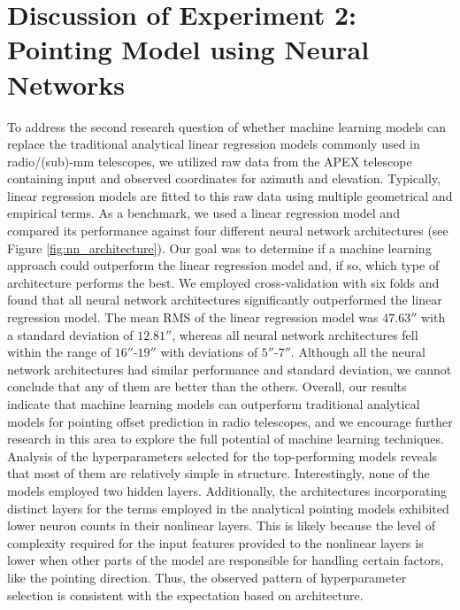 \section{Discussion of Experiment 2: Pointing Model using Neural Networks}

To address the second research question of whether machine learning models can replace the traditional analytical linear regression models commonly used in radio/(sub)-mm telescopes,
we utilized raw data from the APEX telescope containing input and observed coordinates for azimuth and elevation.
Typically, linear regression models are fitted to this raw data using multiple geometrical and empirical terms.
As a benchmark, we used a linear regression model and compared its performance against four different neural network architectures (see Figure \ref{fig:nn_architecture}).
Our goal was to determine if a machine learning approach could outperform the linear regression model and, if so, which type of architecture performs the best.
We employed cross-validation with six folds and found that all neural network architectures significantly outperformed the linear regression model.
The mean RMS of the linear regression model was $47.63''$ with a standard deviation of $12.81''$, whereas all neural network architectures fell within the range of $16''$-$19''$ with deviations of $5''$-$7''$.
Although all the neural network architectures had similar performance and standard deviation, we cannot conclude that any of them are better than the others.
Overall, our results indicate that machine learning models can outperform traditional analytical models for pointing offset prediction in radio telescopes,
and we encourage further research in this area to explore the full potential of machine learning techniques.\\

Analysis of the hyperparameters selected for the top-performing models reveals that most of them are relatively simple in structure.
Interestingly, none of the models employed two hidden layers.
Additionally, the architectures incorporating distinct layers for the terms employed in the analytical pointing models exhibited lower neuron counts in their nonlinear layers.
This is likely because the level of complexity required for the input features provided to the nonlinear layers is lower when other parts of the model are responsible for handling certain factors,
like the pointing direction.
Thus, the observed pattern of hyperparameter selection is consistent with the expectation based on architecture.\\

